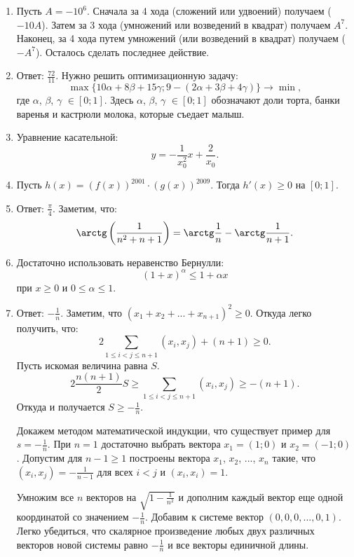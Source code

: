 \begin{enumerate}

\item Пусть $A = -10^6$. Сначала за 4 хода (сложений или удвоений) получаем ($-10A$). Затем за 3 хода (умножений или возведений в квадрат) получаем $A^7$. Наконец, за 4 хода путем умножений (или возведений в квадрат) получаем ($-A^7$). Осталось сделать последнее действие.

\item Ответ: $\frac{72}{11}$. Нужно решить оптимизационную задачу:
$$\max\lbrace 10\alpha + 8 \beta + 15 \gamma; 9 - (2 \alpha + 3 \beta + 4 \gamma) \rbrace \to \min,$$
где $\alpha$, $\beta$, $\gamma$ $\in [0; 1]$. Здесь
$\alpha$, $\beta$, $\gamma$ $\in [0; 1]$ обозначают доли торта, банки варенья и кастрюли молока, которые съедает малыш.

\item Уравнение касательной:
$$y = -\frac{1}{x_0^2} x + \frac{2}{x_0}.$$

\item Пусть $h(x) = (f(x))^{2001} \cdot (g(x))^{2009}$. Тогда $h'(x) \geqslant 0$ на $[0; 1]$.

\item Ответ: $\frac{\pi}{4}$. Заметим, что:
$$ \arctg \left( \frac{1}{n^2+n+1} \right) = \arctg \frac{1}{n} - \arctg \frac{1}{n+1}.$$

\item Достаточно использовать неравенство Бернулли:
$$(1 + x)^\alpha \leqslant 1 + \alpha x$$
при $x \geqslant 0$ и $0 \leqslant \alpha \leqslant 1$.

\item Ответ: $-\frac{1}{n}$. Заметим, что $(x_1 + x_2 + ... + x_{n+1})^2 \geqslant 0$. Откуда легко получить, что:
$$ 2 \sum_{1 \leqslant i < j \leqslant n+1} (x_i, x_j) + (n+1) \geqslant 0.$$
Пусть искомая величина равна $S$.
$$ 2 \frac{n(n+1)}{2} S \geqslant \sum_{1 \leqslant i < j \leqslant n+1} (x_i, x_j) \geqslant - (n+1).$$
Откуда и получается $S \geqslant -\frac{1}{n}$.

Докажем методом математической индукции, что существует пример для $s = -\frac{1}{n}$. При $n = 1$ достаточно выбрать вектора $x_1 = (1; 0)$ и $x_2 = (-1; 0)$. Допустим для $n - 1 \geqslant 1$ построены вектора $x_1$, $x_2$, ..., $x_{n}$ такие, что $(x_i, x_j) = - \frac{1}{n-1}$ для всех $i < j$ и $(x_i, x_i) = 1$. 

Умножим все $n$ векторов на $\sqrt{1 - \frac{1}{n^2}}$ и дополним каждый вектор еще одной координатой со значением $-\frac{1}{n}$. Добавим к системе вектор $(0, 0, 0, ..., 0, 1)$. Легко убедиться, что скалярное произведение любых двух различных векторов новой системы равно $-\frac{1}{n}$ и все векторы единичной длины.
\end{enumerate}
